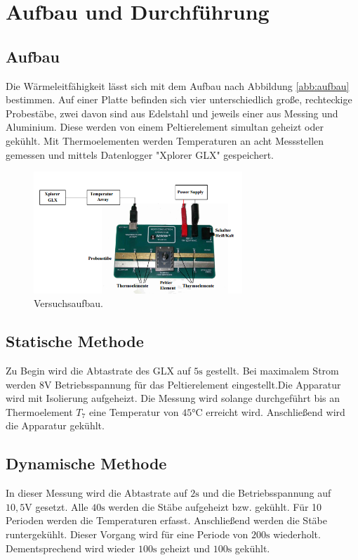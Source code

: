 \section{Aufbau und Durchführung}
\label{sec:Durchführung}
\subsection{Aufbau}
Die Wärmeleitfähigkeit lässt sich mit dem Aufbau nach Abbildung \ref{abb:aufbau}
bestimmen. Auf einer Platte befinden sich vier unterschiedlich große,
rechteckige Probestäbe, zwei davon sind aus Edelstahl und jeweils einer
aus Messing und Aluminium. Diese werden von einem Peltierelement simultan
geheizt oder gekühlt. Mit Thermoelementen werden Temperaturen an acht Messstellen
gemessen und mittels Datenlogger "Xplorer GLX" gespeichert.
\begin{figure}
  \centering
  \includegraphics[width=0.7\textwidth]{aufbau.png}
\caption{Versuchsaufbau.\cite{sample}}
\label{abb:Aufbau}
\end{figure}
\subsection{Statische Methode}
Zu Begin wird die Abtastrate des GLX auf $5 \si{\second}$ gestellt.
Bei maximalem Strom werden $8 \si{\volt}$ Betriebsspannung für das
Peltierelement eingestellt.Die Apparatur wird mit Isolierung aufgeheizt.
Die Messung wird solange durchgeführt bis an Thermoelement $T_7$ eine
Temperatur von $45\si{\degreeCelsius}$ erreicht wird.
Anschließend wird die Apparatur gekühlt.
\subsection{Dynamische Methode}
In dieser Messung wird die Abtastrate auf $2\si{\second}$
und die Betriebsspannung auf $10,5\si{\volt}$ gesetzt.
Alle $40\si{\second}$ werden die Stäbe aufgeheizt bzw. gekühlt.
Für 10 Perioden werden die Temperaturen erfasst.
Anschließend werden die Stäbe runtergekühlt.
Dieser Vorgang wird für eine Periode von $200\si{\second}$ wiederholt.
Dementsprechend wird wieder $100\si{\second}$ geheizt und $100\si{\second}$ gekühlt.
